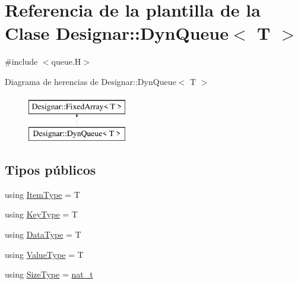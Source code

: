 \hypertarget{class_designar_1_1_dyn_queue}{}\section{Referencia de la plantilla de la Clase Designar\+:\+:Dyn\+Queue$<$ T $>$}
\label{class_designar_1_1_dyn_queue}


{\ttfamily \#include $<$queue.\+H$>$}

Diagrama de herencias de Designar\+:\+:Dyn\+Queue$<$ T $>$\begin{figure}[H]
\begin{center}
\leavevmode
\includegraphics[height=2.000000cm]{class_designar_1_1_dyn_queue}
\end{center}
\end{figure}
\subsection*{Tipos públicos}
\begin{DoxyCompactItemize}
\item 
using \hyperlink{class_designar_1_1_dyn_queue_a45a4b5b9dd6a921dbc6919802d34dd9e}{Item\+Type} = T
\item 
using \hyperlink{class_designar_1_1_dyn_queue_a0591681d66d914b3fb11f71d36759984}{Key\+Type} = T
\item 
using \hyperlink{class_designar_1_1_dyn_queue_a79504f1ab8156a3eaee8c9c0aaaf1b8a}{Data\+Type} = T
\item 
using \hyperlink{class_designar_1_1_dyn_queue_a6528f67f5ad9ecbe0f8a21b88f3cb832}{Value\+Type} = T
\item 
using \hyperlink{class_designar_1_1_dyn_queue_a376b5cd2f4a47d734fc1e73955197358}{Size\+Type} = \hyperlink{namespace_designar_aa72662848b9f4815e7bf31a7cf3e33d1}{nat\+\_\+t}
\end{DoxyCompactItemize}
